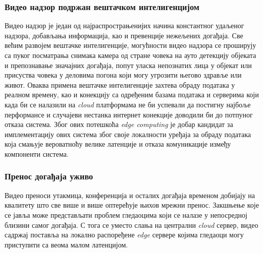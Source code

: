     \subsubsection{Видео надзор подржан вештачком интелигенцијом}

    Видео надзор је један од најраспрострањенијих начина константног удаљеног надзора, добављања информација, као и превенције нежељених догађаја. Све већим развојем вештачке интелигенције, могућности видео надзора се проширују са пуког посматрања снимака камера од стране човека на ауто детекцију објеката и препознавање значајних догађаја, попут уласка непознатих лица у објекат или присуства човека у деловима погона који могу угрозити његово здравље или живот. Оваква примена вештачке интелигенције захтева обраду података у реалном времену, као и конекцију са одређеним базама података и серверима који када би се налазили на \textit{cloud} платформама не би успевали да постигну најбоље перформансе и случајеви нестанка интернет конекције доводили би до потпуног отказа система. Због ових потешкоћа \textit{edge computing} је добар кандидат за имплементацију ових система због своје локалности уређаја за обраду података која смањује вероватноћу велике латенције и отказа комуникације између компоненти система.

    \subsubsection{Пренос догађаја уживо}

    Видео преноси утакмица, конференција и осталих догађаја временом добијају на квалитету што све више и више оптерећује њихов мрежни пренос. Закшњење које се јавља може представљати проблем гледаоцима који се налазе у непосредној близини самог догађаја. С тога се уместо слања на централни \textit{cloud} сервер, видео садржај поставља на локално распоређене \textit{edge} сервере којима гледаоци могу приступити са веома малом латенцијом. 
